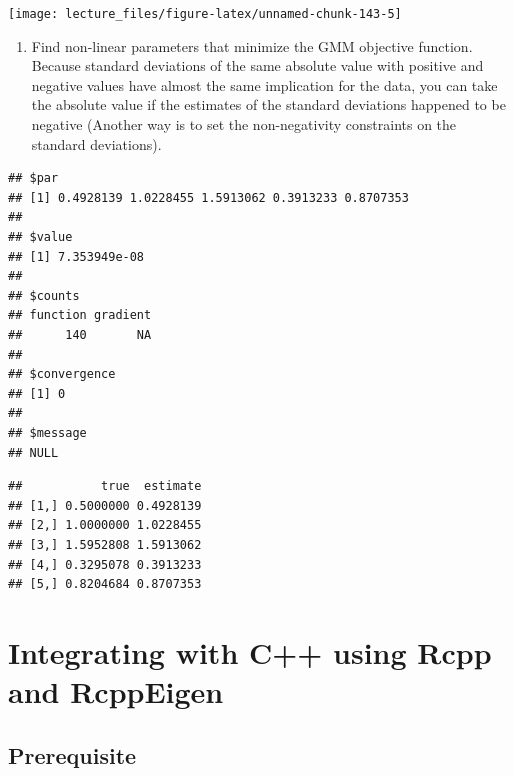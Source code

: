 \documentclass[
]{book}
\providecommand{\tightlist}{%
  \setlength{\itemsep}{0pt}\setlength{\parskip}{0pt}}
\begin{document}
\begin{center}\texttt{[image: lecture\_files/figure-latex/unnamed-chunk-143-5]} \end{center}

\begin{enumerate}
\def\labelenumi{\arabic{enumi}.}
\setcounter{enumi}{12}
\tightlist
\item
  Find non-linear parameters that minimize the GMM objective function. Because standard deviations of the same absolute value with positive and negative values have almost the same implication for the data, you can take the absolute value if the estimates of the standard deviations happened to be negative (Another way is to set the non-negativity constraints on the standard deviations).
\end{enumerate}

\begin{verbatim}
## $par
## [1] 0.4928139 1.0228455 1.5913062 0.3913233 0.8707353
## 
## $value
## [1] 7.353949e-08
## 
## $counts
## function gradient 
##      140       NA 
## 
## $convergence
## [1] 0
## 
## $message
## NULL
\end{verbatim}

\begin{verbatim}
##           true  estimate
## [1,] 0.5000000 0.4928139
## [2,] 1.0000000 1.0228455
## [3,] 1.5952808 1.5913062
## [4,] 0.3295078 0.3913233
## [5,] 0.8204684 0.8707353
\end{verbatim}

\hypertarget{rcpp}{%
\chapter{Integrating with C++ using Rcpp and RcppEigen}\label{rcpp}}

\hypertarget{prerequisite}{%
\section{Prerequisite}\label{prerequisite}}
\end{document}
